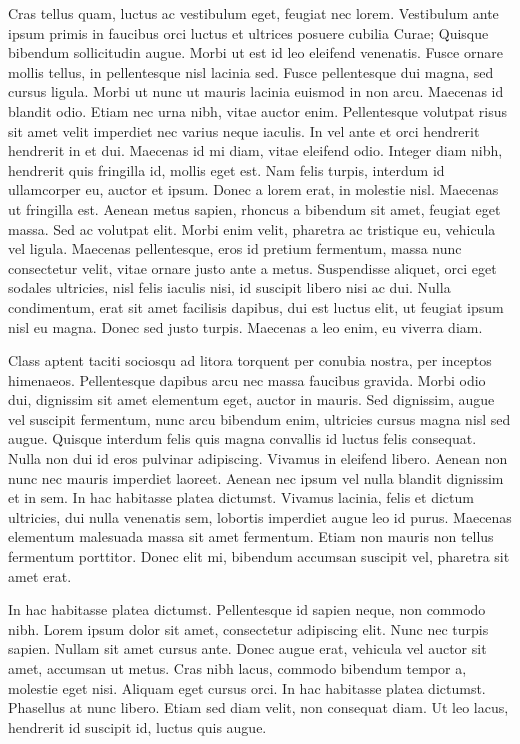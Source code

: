 \documentclass[letterpaper,12pt,twocolumn,landscape]{memoir}
\begin{document}
Cras tellus quam, luctus ac vestibulum eget, feugiat nec lorem. Vestibulum ante ipsum primis in faucibus orci luctus et ultrices posuere cubilia Curae; Quisque bibendum sollicitudin augue. Morbi ut est id leo eleifend venenatis. Fusce ornare mollis tellus, in pellentesque nisl lacinia sed. Fusce pellentesque dui magna, sed cursus ligula. Morbi ut nunc ut mauris lacinia euismod in non arcu. Maecenas id blandit odio. Etiam nec urna nibh, vitae auctor enim. Pellentesque volutpat risus sit amet velit imperdiet nec varius neque iaculis. In vel ante et orci hendrerit hendrerit in et dui. Maecenas id mi diam, vitae eleifend odio. Integer diam nibh, hendrerit quis fringilla id, mollis eget est. Nam felis turpis, interdum id ullamcorper eu, auctor et ipsum. Donec a lorem erat, in molestie nisl. Maecenas ut fringilla est.
Aenean metus sapien, rhoncus a bibendum sit amet, feugiat eget massa. Sed ac volutpat elit. Morbi enim velit, pharetra ac tristique eu, vehicula vel ligula. Maecenas pellentesque, eros id pretium fermentum, massa nunc consectetur velit, vitae ornare justo ante a metus. Suspendisse aliquet, orci eget sodales ultricies, nisl felis iaculis nisi, id suscipit libero nisi ac dui. Nulla condimentum, erat sit amet facilisis dapibus, dui est luctus elit, ut feugiat ipsum nisl eu magna. Donec sed justo turpis. Maecenas a leo enim, eu viverra diam.

Class aptent taciti sociosqu ad litora torquent per conubia nostra, per inceptos himenaeos. Pellentesque dapibus arcu nec massa faucibus gravida. Morbi odio dui, dignissim sit amet elementum eget, auctor in mauris. Sed dignissim, augue vel suscipit fermentum, nunc arcu bibendum enim, ultricies cursus magna nisl sed augue. Quisque interdum felis quis magna convallis id luctus felis consequat. Nulla non dui id eros pulvinar adipiscing. Vivamus in eleifend libero. Aenean non nunc nec mauris imperdiet laoreet. Aenean nec ipsum vel nulla blandit dignissim et in sem. In hac habitasse platea dictumst. Vivamus lacinia, felis et dictum ultricies, dui nulla venenatis sem, lobortis imperdiet augue leo id purus. Maecenas elementum malesuada massa sit amet fermentum. Etiam non mauris non tellus fermentum porttitor. Donec elit mi, bibendum accumsan suscipit vel, pharetra sit amet erat.

In hac habitasse platea dictumst. Pellentesque id sapien neque, non commodo nibh. Lorem ipsum dolor sit amet, consectetur adipiscing elit. Nunc nec turpis sapien. Nullam sit amet cursus ante. Donec augue erat, vehicula vel auctor sit amet, accumsan ut metus. Cras nibh lacus, commodo bibendum tempor a, molestie eget nisi. Aliquam eget cursus orci. In hac habitasse platea dictumst. Phasellus at nunc libero. Etiam sed diam velit, non consequat diam. Ut leo lacus, hendrerit id suscipit id, luctus quis augue.
\end{document}
